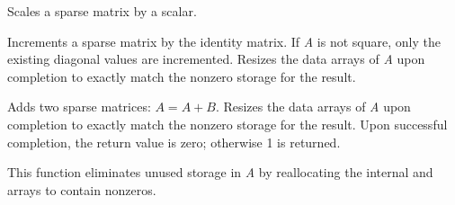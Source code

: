 \documentclass[letterpaper,10pt,english]{sphinxmanual}
\begin{document}

\begin{fulllineitems}
\label{linear_solvers/SLS:ScaleSparseMat}
Scales a sparse matrix by a scalar.

\end{fulllineitems}


\begin{fulllineitems}
\label{linear_solvers/SLS:AddIdentitySparseMat}
Increments a sparse matrix by the identity matrix.  If \emph{A} is not
square, only the existing diagonal values are incremented.  Resizes
the data arrays of \emph{A} upon completion to exactly match the
nonzero storage for the result.

\end{fulllineitems}


\begin{fulllineitems}
\label{linear_solvers/SLS:SlsAddMat}
Adds two sparse matrices: $A = A+B$.  Resizes the data arrays
of \emph{A} upon completion to exactly match the nonzero storage for
the result.  Upon successful completion, the return value is zero;
otherwise 1 is returned.

\end{fulllineitems}


\begin{fulllineitems}
\label{linear_solvers/SLS:ReallocSparseMat}
This function eliminates unused storage in \emph{A} by reallocating
the internal  and  arrays to contain
 nonzeros.

\end{fulllineitems}

\end{document}
